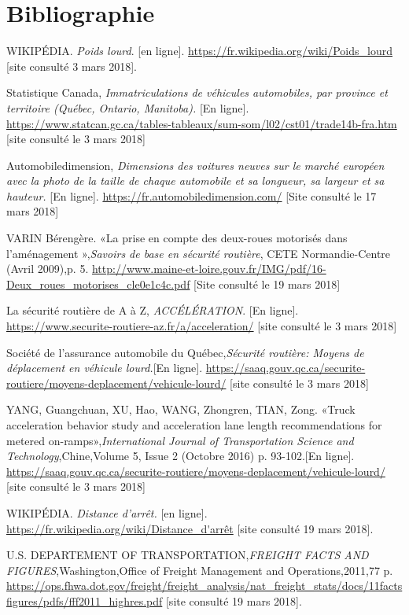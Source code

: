 \documentclass[12pt,letterpaper]{article}
\begin{document}
\section{Bibliographie}
\begin{thebibliography}{1} %

 WIKIPÉDIA. \textit{Poids lourd}. [en ligne]. \url{https://fr.wikipedia.org/wiki/Poids_lourd} [site consulté 3 mars 2018]. 

 Statistique Canada, 
\textit{Immatriculations de véhicules automobiles, par province et territoire 
(Québec, Ontario, Manitoba).} [En ligne]. \url{https://www.statcan.gc.ca/tables-tableaux/sum-som/l02/cst01/trade14b-fra.htm} [site consulté le 3 mars 2018]

 Automobiledimension, 
\textit{Dimensions des voitures neuves sur le marché européen avec la photo de
la taille de chaque automobile et sa longueur, sa largeur et sa hauteur.} [En ligne]. \url{https://fr.automobiledimension.com/} [Site consulté le 17 mars 2018]

VARIN Bérengère. «La prise en compte des deux-roues
motorisés dans l’aménagement »,\textit{Savoirs de base
en sécurité routière}, CETE Normandie-Centre (Avril 2009),p. 5.
\url{http://www.maine-et-loire.gouv.fr/IMG/pdf/16-Deux_roues_motorises_cle0e1c4c.pdf} [Site consulté le 19 mars 2018]

 La sécurité routière de A à Z, \textit{ACCÉLÉRATION}. [En ligne]. \url{https://www.securite-routiere-az.fr/a/acceleration/} [site consulté le 3 mars 2018]

 Société de l'assurance automobile du Québec,\textit{Sécurité routière: Moyens de déplacement en véhicule lourd.}[En ligne]. \url{https://saaq.gouv.qc.ca/securite-routiere/moyens-deplacement/vehicule-lourd/} [site consulté le 3 mars 2018]

 YANG, Guangchuan, XU, Hao, WANG, Zhongren, TIAN, Zong. «Truck acceleration behavior study and acceleration lane length recommendations for metered on-ramps»,\textit{International Journal of Transportation Science and Technology},Chine,Volume 5, Issue 2 (Octobre 2016) p. 93-102.[En ligne]. \url{https://saaq.gouv.qc.ca/securite-routiere/moyens-deplacement/vehicule-lourd/} [site consulté le 3 mars 2018]

 WIKIPÉDIA. \textit{Distance d'arrêt.} [en ligne]. \url{https://fr.wikipedia.org/wiki/Distance_d'arrêt} [site consulté 19 mars 2018].

 U.S. DEPARTEMENT OF TRANSPORTATION,\textit{FREIGHT FACTS AND
FIGURES},Washington,Office of Freight Management and Operations,2011,77 p.
  \url{https://ops.fhwa.dot.gov/freight/freight_analysis/nat_freight_stats/docs/11factsfigures/pdfs/fff2011_highres.pdf} [site consulté 19 mars 2018]. 

\end{thebibliography}
\end{document}
